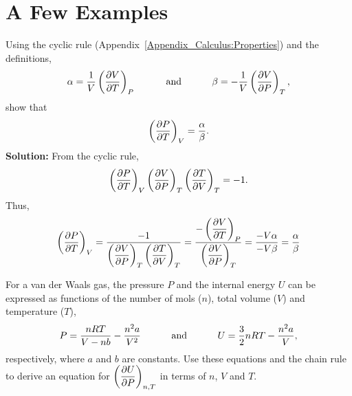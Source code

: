
\chapter{A Few Examples}

  \begin{list}{\bf Example :~}{}
%
     \item\label{example1} Using the cyclic rule (Appendix~\ref{Appendix_Calculus:Properties}) and the definitions,
    \begin{displaymath}
        \alpha = \displaystyle\frac{1}{V}\left(\displaystyle\frac{\partial V}{\partial T}\right)_{P} \hspace{1cm}\text{ and }\hspace{1cm} \beta = -\displaystyle\frac{1}{V}\left(\displaystyle\frac{\partial V}{\partial P}\right)_{T},
    \end{displaymath}
    \noindent show that 
    \begin{displaymath}
      \left(\displaystyle\frac{\partial P}{\partial T}\right)_{V} = \displaystyle\frac{\alpha}{\beta}.
    \end{displaymath}
\medskip
     {\bf Solution:} From the cyclic rule,
       \begin{displaymath}
          \left(\displaystyle\frac{\partial P}{\partial T}\right)_{V}\left(\displaystyle\frac{\partial V}{\partial P}\right)_{T}\left(\displaystyle\frac{\partial T}{\partial V}\right)_{T} = -1.
       \end{displaymath}
     Thus,
       \begin{displaymath}
          \left(\displaystyle\frac{\partial P}{\partial T}\right)_{V} = \displaystyle\frac{-1}{\left(\displaystyle\frac{\partial V}{\partial P}\right)_{T}\left(\displaystyle\frac{\partial T}{\partial V}\right)_{T}} = \displaystyle\frac{-\left(\displaystyle\frac{\partial V}{\partial T}\right)_{P}}{\left(\displaystyle\frac{\partial V}{\partial P}\right)_{T}} = \displaystyle\frac{-V\alpha}{-V\beta} = \displaystyle\frac{\alpha}{\beta}
       \end{displaymath}
      
%
     \item\label{example2} For a van der Waals gas, the pressure $P$ and the internal energy $U$ can be expressed as functions of the number of mols ($n$), total volume ($V$) and temperature ($T$),
       \begin{displaymath}
         P = \displaystyle\frac{n R T}{V-nb} - \displaystyle\frac{n^{2}a}{V^{2}} \hspace{1cm}\text{ and }\hspace{1cm} U = \displaystyle\frac{3}{2}n R T - \displaystyle\frac{n^{2}a}{V},
       \end{displaymath}
       respectively, where $a$ and $b$ are constants. Use these equations and the chain rule to derive an equation for $\left(\displaystyle\frac{\partial U}{\partial P}\right)_{n,T}$ in terms of $n$, $V$ and $T$.


\end{list}
